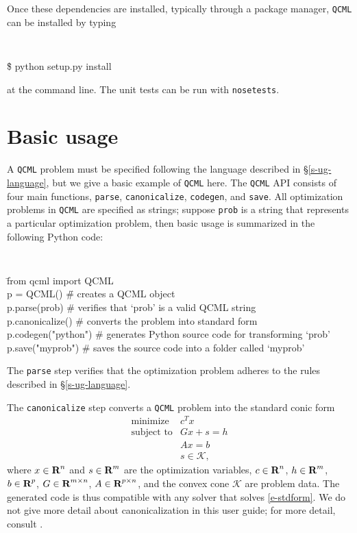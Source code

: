 \documentclass[11pt]{article}
\def\qcml{\texttt{QCML}\xspace}
\newcommand{\reals}{{\mbox{\bf R}}}
\begin{document}
Once these dependencies are installed, typically through a package manager,
\qcml can be installed by typing
{\tt
\begin{tabbing}
  \qquad \= \$ python setup.py install
\end{tabbing}
}
\noindent at the command line. The unit tests can be run with {\tt nosetests}.

\section{Basic usage}
A \qcml problem must be specified following the language described in
\S\ref{s-ug-language}, but we give a basic example of \qcml here. The \qcml
API consists of four main functions, {\tt parse}, {\tt canonicalize},
{\tt codegen}, and {\tt save}. All optimization problems in \qcml are
specified as strings; suppose {\tt prob} is a string that represents a
particular optimization problem, then basic usage is summarized
in the following Python code:
{\tt
\begin{tabbing}
  \qquad \= from qcml import QCML \\
  \> p = QCML() \qquad \qquad \qquad \= \# creates a QCML object \\
  \> p.parse(prob) \> \# verifies that `prob' is a valid QCML string \\
  \> p.canonicalize() \> \# converts the problem into standard form \\
  \> p.codegen("python") \> \# generates Python source code for transforming `prob' \\
  \> p.save("myprob") \> \# saves the source code into a folder called `myprob'
\end{tabbing}
}
\noindent The {\tt parse} step verifies that the optimization problem adheres
to the rules described in \S\ref{s-ug-language}.

The {\tt canonicalize} step converts a \qcml problem into the
standard conic form
\begin{equation}
  \label{e-stdform}
\begin{array}{ll}
  \mbox{minimize} & c^Tx \\
  \mbox{subject to} & Gx + s = h \\
  & Ax = b\\
  & s \in \mathcal{K},
\end{array}
\end{equation}
where $x \in \reals^n$ and $s \in \reals^m$ are the optimization variables,
$c \in \reals^n$, $h \in \reals^m$, $b \in \reals^p$, $G \in \reals^{m\times n}$,
$A \in \reals^{p \times n}$, and the convex cone $\mathcal{K}$ are problem
data. The generated code is thus compatible with any solver that solves
\eqref{e-stdform}. We do not give more detail about canonicalization in this
user guide; for more detail, consult \cite{CVX, GB:08, CPD:13}.
\end{document}
